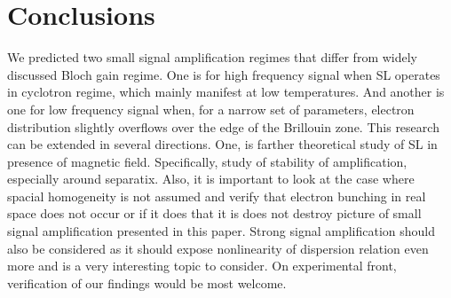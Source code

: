 \documentclass[40pt,letterpaper,physrev]{article}
\begin{document}
    \section{Conclusions}
    We predicted two small signal amplification regimes that differ from widely discussed Bloch gain regime. One is for
    high frequency signal when SL operates in cyclotron regime, which mainly manifest at low temperatures. And another
    is one for low frequency signal when, for a narrow set of parameters, electron distribution slightly overflows over
    the edge of the Brillouin zone. This research can be extended in several directions. One, is farther theoretical
    study of SL in presence of magnetic field. Specifically, study of stability of amplification, especially around
    separatix. Also, it is important to look at the case where spacial homogeneity is not assumed and verify that
    electron bunching in real space does not occur or if it does that it is does not destroy picture of small signal
    amplification presented in this paper. Strong signal amplification should also be considered as it should expose
    nonlinearity of dispersion relation even more and is a very interesting topic to consider. On experimental front,
    verification of our findings would be most welcome.    
  	
   	\newpage
\end{document}
